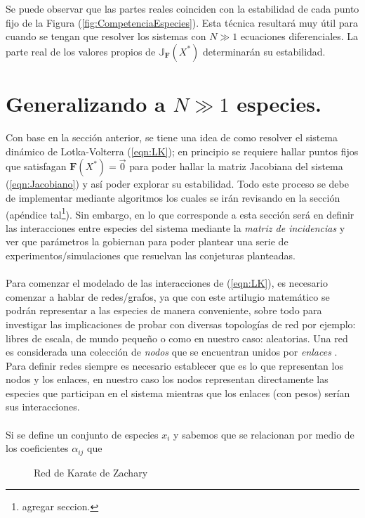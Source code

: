 Se puede observar que las partes reales coinciden con la estabilidad de cada punto fijo de la Figura (\ref{fig:CompetenciaEspecies}). Esta técnica resultará muy útil para cuando se tengan que resolver los sistemas con $N\gg 1$ ecuaciones diferenciales. La parte real de los valores propios de $\mathbb{J}_{\textbf{F}}(X^*)$ determinarán su estabilidad.
\section{Generalizando a $N\gg 1$ especies.}

Con base en la sección anterior, se tiene una idea de como resolver el sistema dinámico de Lotka-Volterra (\ref{eqn:LK}); en principio se requiere hallar puntos fijos que satisfagan $\textbf{F}(X^*)=\vec{0}$ para poder hallar la matriz Jacobiana del sistema (\ref{eqn:Jacobiano}) y así poder explorar su estabilidad. Todo este proceso se debe de implementar mediante algoritmos los cuales se irán revisando en la sección (apéndice tal\footnote{agregar seccion.}). Sin embargo, en lo que corresponde a esta sección será en definir las interacciones entre especies del sistema mediante la \textit{matriz de incidencias} y ver que parámetros la gobiernan para poder plantear una serie de experimentos/simulaciones que resuelvan las conjeturas planteadas.
\\
\\
Para comenzar el modelado de las interacciones de (\ref{eqn:LK}), es necesario comenzar a hablar de redes/grafos, ya que con este artilugio matemático se podrán representar a las especies de manera conveniente, sobre todo para investigar las implicaciones de probar con diversas topologías de red por ejemplo: libres de escala, de mundo pequeño o como en nuestro caso: aleatorias. Una red es considerada una colección de \textit{nodos} que se encuentran unidos por \textit{enlaces} \cite{newman2018networks}. Para definir redes siempre es necesario establecer que es lo que representan los nodos y los enlaces, en nuestro caso los nodos representan directamente las especies que participan en el sistema mientras que los enlaces (con pesos) serían sus interacciones.\\
\\
Si se define un conjunto de especies $x_i$ y sabemos que se relacionan por medio de los coeficientes $\alpha_{ij}$ que
\begin{figure} \vspace{-30pt} \begin{center}
		 
	\end{center} 
	\vspace{-20pt} 
	\caption{Red de Karate de Zachary} 
	\vspace{-20pt}
	\label{fig:RedKarate}
\end{figure} 
